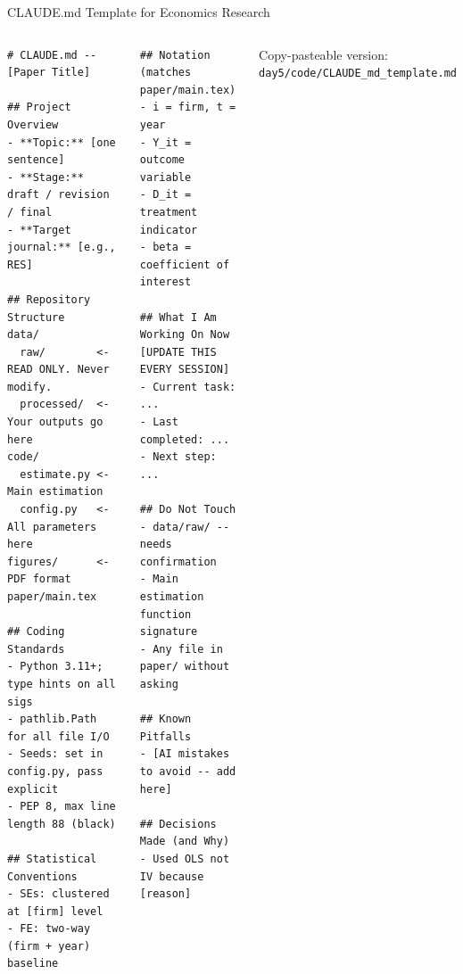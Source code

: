 \documentclass[aspectratio=169,10pt]{beamer}
\begin{document}
\begin{frame}[fragile]{CLAUDE.md Template for Economics Research}
\begin{columns}[T]
\begin{lstlisting}[style=bash, basicstyle=\tiny\ttfamily]
# CLAUDE.md -- [Paper Title]

## Project Overview
- **Topic:** [one sentence]
- **Stage:** draft / revision / final
- **Target journal:** [e.g., RES]

## Repository Structure
data/
  raw/        <- READ ONLY. Never modify.
  processed/  <- Your outputs go here
code/
  estimate.py <- Main estimation
  config.py   <- All parameters here
figures/      <- PDF format
paper/main.tex

## Coding Standards
- Python 3.11+; type hints on all sigs
- pathlib.Path for all file I/O
- Seeds: set in config.py, pass explicit
- PEP 8, max line length 88 (black)

## Statistical Conventions
- SEs: clustered at [firm] level
- FE: two-way (firm + year) baseline
\end{lstlisting}

\begin{lstlisting}[style=bash, basicstyle=\tiny\ttfamily]
## Notation (matches paper/main.tex)
- i = firm, t = year
- Y_it = outcome variable
- D_it = treatment indicator
- beta = coefficient of interest

## What I Am Working On Now
[UPDATE THIS EVERY SESSION]
- Current task: ...
- Last completed: ...
- Next step: ...

## Do Not Touch
- data/raw/ -- needs confirmation
- Main estimation function signature
- Any file in paper/ without asking

## Known Pitfalls
- [AI mistakes to avoid -- add here]

## Decisions Made (and Why)
- Used OLS not IV because [reason]
\end{lstlisting}

\vspace{0.1em}
{\tiny Copy-pasteable version: \texttt{day5/code/CLAUDE\_md\_template.md}}
\end{columns}
\end{frame}
\end{document}
